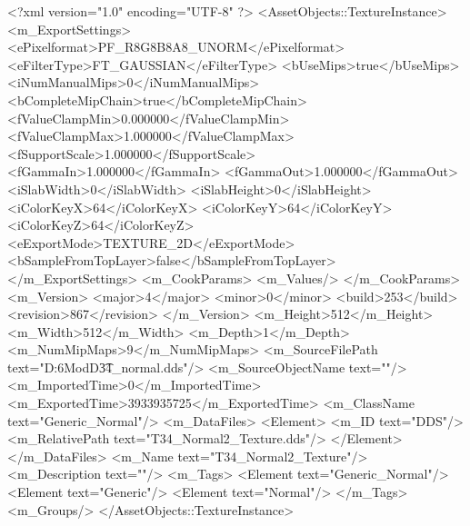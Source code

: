 <?xml version="1.0" encoding="UTF-8" ?>
<AssetObjects::TextureInstance>
	<m_ExportSettings>
		<ePixelformat>PF_R8G8B8A8_UNORM</ePixelformat>
		<eFilterType>FT_GAUSSIAN</eFilterType>
		<bUseMips>true</bUseMips>
		<iNumManualMips>0</iNumManualMips>
		<bCompleteMipChain>true</bCompleteMipChain>
		<fValueClampMin>0.000000</fValueClampMin>
		<fValueClampMax>1.000000</fValueClampMax>
		<fSupportScale>1.000000</fSupportScale>
		<fGammaIn>1.000000</fGammaIn>
		<fGammaOut>1.000000</fGammaOut>
		<iSlabWidth>0</iSlabWidth>
		<iSlabHeight>0</iSlabHeight>
		<iColorKeyX>64</iColorKeyX>
		<iColorKeyY>64</iColorKeyY>
		<iColorKeyZ>64</iColorKeyZ>
		<eExportMode>TEXTURE_2D</eExportMode>
		<bSampleFromTopLayer>false</bSampleFromTopLayer>
	</m_ExportSettings>
	<m_CookParams>
		<m_Values/>
	</m_CookParams>
	<m_Version>
		<major>4</major>
		<minor>0</minor>
		<build>253</build>
		<revision>867</revision>
	</m_Version>
	<m_Height>512</m_Height>
	<m_Width>512</m_Width>
	<m_Depth>1</m_Depth>
	<m_NumMipMaps>9</m_NumMipMaps>
	<m_SourceFilePath text="D:\Civ6Mod\3D\t34_normal.dds"/>
	<m_SourceObjectName text=""/>
	<m_ImportedTime>0</m_ImportedTime>
	<m_ExportedTime>3933935725</m_ExportedTime>
	<m_ClassName text="Generic_Normal"/>
	<m_DataFiles>
		<Element>
			<m_ID text="DDS"/>
			<m_RelativePath text="T34_Normal2_Texture.dds"/>
		</Element>
	</m_DataFiles>
	<m_Name text="T34_Normal2_Texture"/>
	<m_Description text=""/>
	<m_Tags>
		<Element text="Generic_Normal"/>
		<Element text="Generic"/>
		<Element text="Normal"/>
	</m_Tags>
	<m_Groups/>
</AssetObjects::TextureInstance>

 